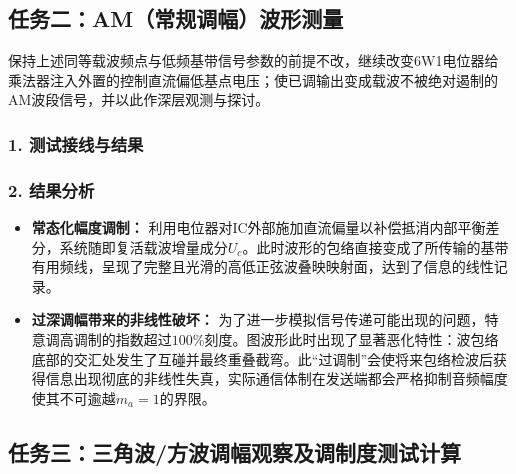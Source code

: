 \documentclass[12pt]{article}
\begin{document}
\subsection*{任务二：AM（常规调幅）波形测量}

保持上述同等载波频点与低频基带信号参数的前提不改，继续改变6W1电位器给乘法器注入外置的控制直流偏低基点电压；使已调输出变成载波不被绝对遏制的AM波段信号，并以此作深层观测与探讨。

\subsubsection*{1. 测试接线与结果}



\subsubsection*{2. 结果分析}
\begin{itemize}
    \item \textbf{常态化幅度调制：} 利用电位器对IC外部施加直流偏量以补偿抵消内部平衡差分，系统随即复活载波增量成分$U_c$。此时波形的包络直接变成了所传输的基带有用频线，呈现了完整且光滑的高低正弦波叠映映射面，达到了信息的线性记录。
    \item \textbf{过深调幅带来的非线性破坏：} 为了进一步模拟信号传递可能出现的问题，特意调高调制的指数超过$100\%$刻度。图波形此时出现了显著恶化特性：波包络底部的交汇处发生了互碰并最终重叠截弯。此“过调制”会使将来包络检波后获得信息出现彻底的非线性失真，实际通信体制在发送端都会严格抑制音频幅度使其不可逾越$m_a=1$的界限。
\end{itemize}

\subsection*{任务三：三角波/方波调幅观察及调制度测试计算}
\end{document}

